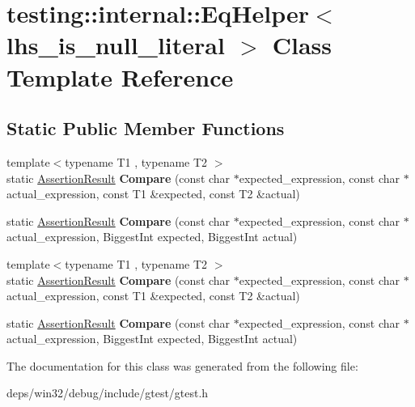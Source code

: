 \hypertarget{classtesting_1_1internal_1_1_eq_helper}{}\section{testing\+:\+:internal\+:\+:Eq\+Helper$<$ lhs\+\_\+is\+\_\+null\+\_\+literal $>$ Class Template Reference}
\label{classtesting_1_1internal_1_1_eq_helper}
\subsection*{Static Public Member Functions}
\begin{DoxyCompactItemize}
\item 
\hypertarget{classtesting_1_1internal_1_1_eq_helper_ac2977ed90cd3c88607f804e43b86b92c}{}{\footnotesize template$<$typename T1 , typename T2 $>$ }\\static \hyperlink{classtesting_1_1_assertion_result}{Assertion\+Result} {\bfseries Compare} (const char $\ast$expected\+\_\+expression, const char $\ast$actual\+\_\+expression, const T1 \&expected, const T2 \&actual)\label{classtesting_1_1internal_1_1_eq_helper_ac2977ed90cd3c88607f804e43b86b92c}

\item 
\hypertarget{classtesting_1_1internal_1_1_eq_helper_a3de996954b41d484c065ed824fe7eac9}{}static \hyperlink{classtesting_1_1_assertion_result}{Assertion\+Result} {\bfseries Compare} (const char $\ast$expected\+\_\+expression, const char $\ast$actual\+\_\+expression, Biggest\+Int expected, Biggest\+Int actual)\label{classtesting_1_1internal_1_1_eq_helper_a3de996954b41d484c065ed824fe7eac9}

\item 
\hypertarget{classtesting_1_1internal_1_1_eq_helper_ac2977ed90cd3c88607f804e43b86b92c}{}{\footnotesize template$<$typename T1 , typename T2 $>$ }\\static \hyperlink{classtesting_1_1_assertion_result}{Assertion\+Result} {\bfseries Compare} (const char $\ast$expected\+\_\+expression, const char $\ast$actual\+\_\+expression, const T1 \&expected, const T2 \&actual)\label{classtesting_1_1internal_1_1_eq_helper_ac2977ed90cd3c88607f804e43b86b92c}

\item 
\hypertarget{classtesting_1_1internal_1_1_eq_helper_a3de996954b41d484c065ed824fe7eac9}{}static \hyperlink{classtesting_1_1_assertion_result}{Assertion\+Result} {\bfseries Compare} (const char $\ast$expected\+\_\+expression, const char $\ast$actual\+\_\+expression, Biggest\+Int expected, Biggest\+Int actual)\label{classtesting_1_1internal_1_1_eq_helper_a3de996954b41d484c065ed824fe7eac9}

\end{DoxyCompactItemize}


The documentation for this class was generated from the following file\+:\begin{DoxyCompactItemize}
\item 
deps/win32/debug/include/gtest/gtest.\+h\end{DoxyCompactItemize}
